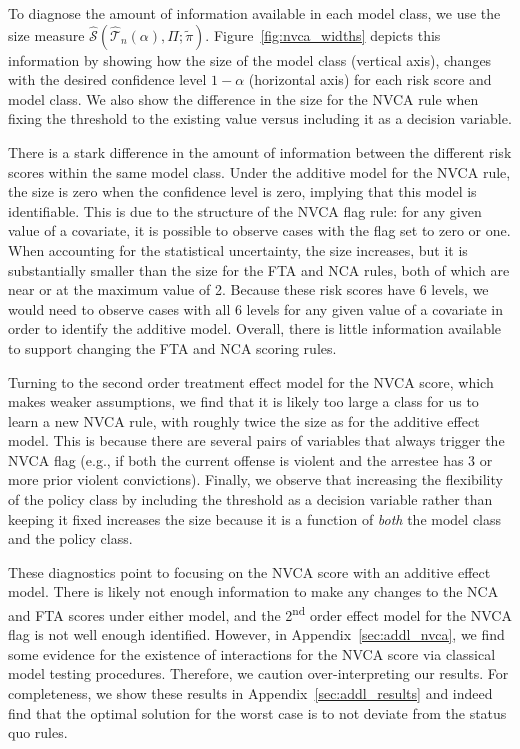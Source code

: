 \documentclass[12pt]{article}
\theoremstyle{definition}
\def\super{\textsuperscript}
\newcommand{\<}{\langle}
\renewcommand{\>}{\rangle}
\begin{document}
To diagnose the amount of information available in each model class,
we use the size measure $\widehat{\mathcal{S}}(\widehat{\mathcal{T}}_n(\alpha), \Pi; \tilde{\pi})$.
Figure~\ref{fig:nvca_widths} depicts this information by showing how
the size of the model class (vertical axis), changes with the desired
confidence level $1 - \alpha$ (horizontal axis) for each risk score
and model class. We
also show the difference in the size for the NVCA rule when fixing the
threshold to the existing value versus including it as a decision variable.

There is a stark difference in the amount of information between the
different risk scores within the same model class.  Under the additive
model for the NVCA rule, the size is zero when the confidence level is
zero, implying that this model is identifiable. This is due to the
structure of the NVCA flag rule: for any given value of a covariate,
it is possible to observe cases with the flag set to zero or one. When
accounting for the statistical uncertainty, the size increases, but it
is substantially smaller than the size for the FTA and NCA rules, both
of which are near or at the maximum value of 2.  Because these risk
scores have 6 levels, we would need to observe cases with all 6 levels
for any given value of a covariate in order to identify the additive
model.  Overall, there is little information available to support changing
the FTA and NCA scoring rules.

Turning to the second order treatment effect model for the NVCA score,
which makes weaker assumptions, we find that it is likely too large a
class for us to learn a new NVCA rule, with roughly twice the size as
for the additive effect model.  This is because there are several
pairs of variables that always trigger the NVCA flag (e.g., if
both the current offense is violent and the arrestee has 3 or more
prior violent convictions).
Finally, we observe that increasing the
flexibility of the policy class by including the threshold as a
decision variable rather than keeping it fixed increases the size
because it is a function of \emph{both} the model class and the policy
class.



These diagnostics point to focusing on the NVCA score with an additive
effect model. There is likely not enough information to make any changes to
the NCA and FTA scores under either model, and the 2\super{nd} order effect
model for the NVCA flag is not well enough identified. 
However, in Appendix~\ref{sec:addl_nvca}, we find some
evidence for the existence of interactions for the NVCA score via classical
model testing procedures.
Therefore, we caution
over-interpreting our results.  For completeness, we show these results
in Appendix~\ref{sec:addl_results} and indeed find that the optimal
solution for the worst case is to not deviate from the status quo
rules.
\end{document}
